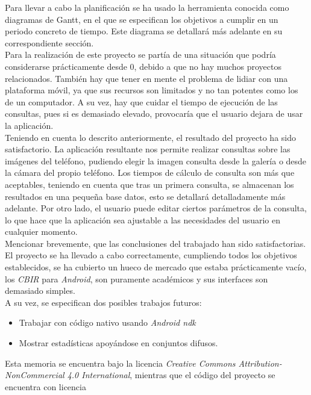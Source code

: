 Para llevar a cabo la planificación se ha usado la herramienta conocida como diagramas de Gantt, en el que se especifican los objetivos a cumplir en un periodo concreto de tiempo. Este diagrama se detallará más adelante en su correspondiente sección.\\

Para la realización de este proyecto se partía de una situación que podría considerarse prácticamente desde 0, debido a que no hay muchos proyectos relacionados. También hay que tener en mente el problema de lidiar con una plataforma móvil, ya que sus recursos son limitados y no tan potentes como los de un computador. A su vez, hay que cuidar el tiempo de ejecución de las consultas, pues si es demasiado elevado, provocaría que el usuario dejara de usar la aplicación.\\

Teniendo en cuenta lo descrito anteriormente, el resultado del proyecto ha sido satisfactorio. La aplicación resultante nos permite realizar consultas sobre las imágenes del teléfono, pudiendo elegir la imagen consulta desde la galería o desde la cámara del propio teléfono. Los tiempos de cálculo de consulta son más que aceptables, teniendo en cuenta que tras un primera consulta, se almacenan los resultados en una pequeña base datos, esto se detallará detalladamente más adelante. Por otro lado, el usuario puede editar ciertos parámetros de la consulta, lo que hace que la aplicación sea ajustable a las necesidades del usuario en cualquier momento.\\

Mencionar brevemente, que las conclusiones del trabajado han sido satisfactorias. El proyecto se ha llevado a cabo correctamente, cumpliendo todos los objetivos establecidos, se ha cubierto un hueco de mercado que estaba prácticamente vacío, los \textit{CBIR} para \textit{Android}, son puramente académicos y sus interfaces son demasiado simples.\\

A su vez, se especifican dos posibles trabajos futuros:

\begin{itemize}

\item Trabajar con código nativo usando \textit{Android ndk}

\item Mostrar estadísticas apoyándose en conjuntos difusos.

\end{itemize}


Esta memoria se encuentra bajo la licencia \textit{Creative Commons Attribution-NonCommercial 4.0 International}, mientras que el código del proyecto se encuentra con licencia





